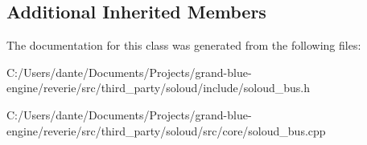 \subsection*{Additional Inherited Members}


The documentation for this class was generated from the following files\+:\begin{DoxyCompactItemize}
\item 
C\+:/\+Users/dante/\+Documents/\+Projects/grand-\/blue-\/engine/reverie/src/third\+\_\+party/soloud/include/soloud\+\_\+bus.\+h\item 
C\+:/\+Users/dante/\+Documents/\+Projects/grand-\/blue-\/engine/reverie/src/third\+\_\+party/soloud/src/core/soloud\+\_\+bus.\+cpp\end{DoxyCompactItemize}
